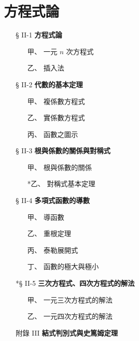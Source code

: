 \section{方程式論}\label{sec:b6-ch2}

\begin{center}
\begin{minipage}{0.75\textwidth}
\begin{itemize}[leftmargin=2em, itemsep=0.3em]
  \item[§ II-1] \textbf{方程式論}
  \begin{itemize}[leftmargin=2em, itemsep=0.2em]
    \item[甲、] 一元 $n$ 次方程式
    \item[乙、] 插入法
  \end{itemize}
  \item[§ II-2] \textbf{代數的基本定理}
  \begin{itemize}[leftmargin=2em, itemsep=0.2em]
    \item[甲、] 複係數方程式
    \item[乙、] 實係數方程式
    \item[丙、] 函數之圖示
  \end{itemize}
  \item[§ II-3] \textbf{根與係數的關係與對稱式}
  \begin{itemize}[leftmargin=2em, itemsep=0.2em]
    \item[甲、] 根與係數的關係
    \item[*乙、] 對稱式基本定理
  \end{itemize}
  \item[§ II-4] \textbf{多項式函數的導數}
  \begin{itemize}[leftmargin=2em, itemsep=0.2em]
    \item[甲、] 導函數
    \item[乙、] 重根定理
    \item[丙、] 泰勒展開式
    \item[丁、] 函數的極大與極小
  \end{itemize}
  \item[*§ II-5] \textbf{三次方程式、四次方程式的解法}
  \begin{itemize}[leftmargin=2em, itemsep=0.2em]
    \item[甲、] 一元三次方程式的解法
    \item[乙、] 一元四次方程式的解法
  \end{itemize}
  \item[附錄 III] \textbf{結式判別式與史篤姆定理}
\end{itemize}
\end{minipage}
\end{center}

